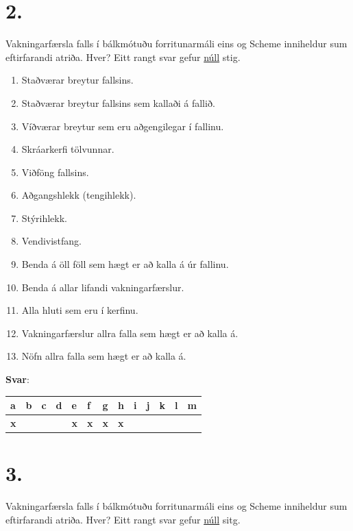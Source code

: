 \documentclass{article}
\newcommand{\bo}[1]{\textbf{#1}}
\begin{document}
\newpage

\section{2.}

Vakningarfærsla falls í bálkmótuðu forritunarmáli eins og Scheme inniheldur sum eftirfarandi atriða.
Hver? Eitt rangt svar gefur \underline{núll} stig.

\begin{enumerate}[label = \alph*)]
    \item Staðværar breytur fallsins.
    \item Staðværar breytur fallsins sem kallaði á fallið.
    \item Víðværar breytur sem eru aðgengilegar í fallinu.
    \item Skráarkerfi tölvunnar.
    \item Viðföng fallsins.
    \item Aðgangshlekk (tengihlekk).
    \item Stýrihlekk.
    \item Vendivistfang.
    \item Benda á öll föll sem hægt er að kalla á úr fallinu.
    \item Benda á allar lifandi vakningarfærslur.
    \item Alla hluti sem eru í kerfinu.
    \item Vakningarfærslur allra falla sem hægt er að kalla á.
    \item Nöfn allra falla sem hægt er að kalla á.
\end{enumerate}

\textbf{Svar}:

\begin{tabularx}{\textwidth}{ |X|X|X|X|X|X|X|X|X|X|X|X|X|}
    \hline
    \textbf{a} & \textbf{b} & \textbf{c}  & \textbf{d} & \textbf{e}  & \textbf{f}  & \textbf{g}  & \textbf{h}  & \textbf{i}  & \textbf{j}  & \textbf{k}  & \textbf{l} & \bo{m}  \\ \hline
     \bo{x} &  &  &  & \bo{x} & \bo{x}  & \bo{x} & \bo{x} &  &  &  &  &  \\ \hline
     
 \end{tabularx}

 \newpage

 \section{3.}
    Vakningarfærsla falls í bálkmótuðu forritunarmáli eins og Scheme inniheldur sum eftirfarandi atriða. Hver? Eitt rangt svar gefur \underline{núll} sitg.
\end{document}
